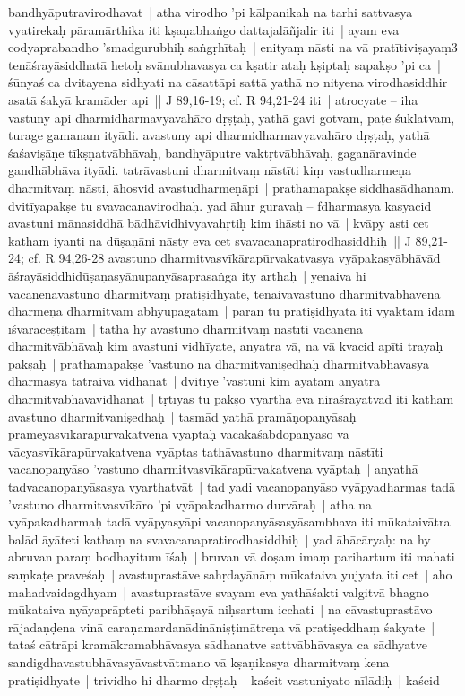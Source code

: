 \documentclass[article,12pt,a4paper]{memoir}%
\begin{document}
bandhyāputravirodhavat | atha virodho 'pi kālpanikaḥ na tarhi sattvasya vyatirekaḥ pāramārthika iti kṣaṇabhaṅgo dattajalāñjalir iti | \label{thakur75-87.23} ayam eva codyaprabandho 'smadgurubhiḥ saṅgṛhītaḥ | enityaṃ nāsti na vā pratītiviṣayaṃ3 tenāśrayāsiddhatā hetoḥ svānubhavasya ca kṣatir ataḥ kṣiptaḥ sapakṣo 'pi ca | śūnyaś ca dvitayena sidhyati na cāsattāpi sattā yathā no nityena virodhasiddhir asatā śakyā kramāder api || J 89,16-19; cf. R 94,21-24 iti | \label{thakur75-87.28} atrocyate – iha vastuny api dharmidharmavyavahāro dṛṣṭaḥ, yathā gavi gotvam, paṭe śuklatvam, turage gamanam ityādi. avastuny api dharmidharmavyavahāro dṛṣṭaḥ, yathā śaśaviṣāṇe tīkṣṇatvābhāvaḥ, bandhyāputre vaktṛtvābhāvaḥ, gaganāravinde gandhābhāva ityādi. tatrāvastuni dharmitvaṃ nāstīti kiṃ vastudharmeṇa dharmitvaṃ nāsti, āhosvid avastudharmeṇāpi | \label{thakur75-88.3} prathamapakṣe siddhasādhanam. dvitīyapakṣe tu svavacanavirodhaḥ. yad āhur guravaḥ – fdharmasya kasyacid avastuni mānasiddhā bādhāvidhivyavahṛtiḥ kim ihāsti no vā | kvāpy asti cet katham iyanti na dūṣaṇāni nāsty eva cet svavacanapratirodhasiddhiḥ || J 89,21-24; cf. R 94,26-28 \label{thakur75-88.8} avastuno dharmitvasvīkārapūrvakatvasya vyāpakasyābhāvād āśrayāsiddhidūṣaṇasyānupanyāsaprasaṅga ity arthaḥ | yenaiva hi vacanenāvastuno dharmitvaṃ pratiṣidhyate, tenaivāvastuno dharmitvābhāvena dharmeṇa dharmitvam abhyupagatam | paran tu pratiṣidhyata iti vyaktam idam īśvaraceṣṭitam | tathā hy avastuno dharmitvaṃ nāstīti vacanena dharmitvābhāvaḥ kim avastuni vidhīyate, anyatra vā, na vā kvacid apīti trayaḥ pakṣāḥ | \label{thakur75-88.13} prathamapakṣe 'vastuno na dharmitvaniṣedhaḥ dharmitvābhāvasya dharmasya tatraiva vidhānāt | \label{thakur75-88.14} dvitīye 'vastuni kim āyātam anyatra dharmitvābhāvavidhānāt | \label{thakur75-88.15} tṛtīyas tu pakṣo vyartha eva nirāśrayatvād iti katham avastuno dharmitvaniṣedhaḥ | tasmād yathā pramāṇopanyāsaḥ prameyasvīkārapūrvakatvena vyāptaḥ vācakaśabdopanyāso vā vācyasvīkārapūrvakatvena vyāptas tathāvastuno dharmitvaṃ nāstīti vacanopanyāso 'vastuno dharmitvasvīkārapūrvakatvena vyāptaḥ | anyathā tadvacanopanyāsasya vyarthatvāt | \label{thakur75-88.19} tad yadi vacanopanyāso vyāpyadharmas tadā 'vastuno dharmitvasvīkāro 'pi vyāpakadharmo durvāraḥ | atha na vyāpakadharmaḥ tadā vyāpyasyāpi vacanopanyāsasyāsambhava iti mūkataivātra balād āyāteti kathaṃ na svavacanapratirodhasiddhiḥ | \label{thakur75-88.22} yad āhācāryaḥ: na hy abruvan paraṃ bodhayitum īśaḥ | bruvan vā doṣam imaṃ parihartum iti mahati saṃkaṭe praveśaḥ | \label{thakur75-88.24} avastuprastāve sahṛdayānāṃ mūkataiva yujyata iti cet | aho mahadvaidagdhyam | avastuprastāve svayam eva yathāśakti valgitvā bhagno mūkataiva nyāyaprāpteti paribhāṣayā niḥsartum icchati | na cāvastuprastāvo rājadaṇḍena vinā caraṇamardanādināniṣṭimātreṇa vā pratiṣeddhaṃ śakyate | tataś cātrāpi kramākramabhāvasya sādhanatve sattvābhāvasya ca sādhyatve sandigdhavastubhāvasyāvastvātmano vā kṣaṇikasya dharmitvaṃ kena pratiṣidhyate | \label{thakur75-89.1} trividho hi dharmo dṛṣṭaḥ | kaścit vastuniyato nīlādiḥ | kaścid 
\end{document}
